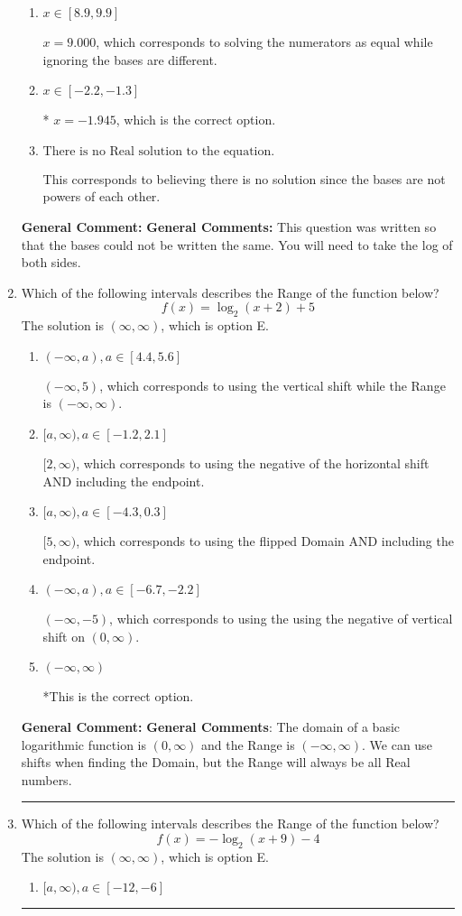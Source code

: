 \documentclass{extbook}[14pt]
\newcommand{\litem}[1]{\item #1

\rule{\textwidth}{0.4pt}}
\begin{document}
\begin{enumerate}
{\begin{enumerate}[label=\Alph*.]
$x = -0.768$, which corresponds to distributing the $\ln(base)$ to the first term of the exponent only.
\item \( x \in [8.9, 9.9] \)

$x = 9.000$, which corresponds to solving the numerators as equal while ignoring the bases are different.
\item \( x \in [-2.2, -1.3] \)

* $x = -1.945$, which is the correct option.
\item \( \text{There is no Real solution to the equation.} \)

This corresponds to believing there is no solution since the bases are not powers of each other.
\end{enumerate}

\textbf{General Comment:} \textbf{General Comments:} This question was written so that the bases could not be written the same. You will need to take the log of both sides.
}
\litem{
Which of the following intervals describes the Range of the function below?
\[ f(x) = \log_2{(x+2)}+5 \]The solution is \( (\infty, \infty) \), which is option E.\begin{enumerate}[label=\Alph*.]
\item \( (-\infty, a), a \in [4.4, 5.6] \)

$(-\infty, 5)$, which corresponds to using the vertical shift while the Range is $(-\infty, \infty)$.
\item \( [a, \infty), a \in [-1.2, 2.1] \)

$[2, \infty)$, which corresponds to using the negative of the horizontal shift AND including the endpoint.
\item \( [a, \infty), a \in [-4.3, 0.3] \)

$[5, \infty)$, which corresponds to using the flipped Domain AND including the endpoint.
\item \( (-\infty, a), a \in [-6.7, -2.2] \)

$(-\infty, -5)$, which corresponds to using the using the negative of vertical shift on $(0, \infty)$.
\item \( (-\infty, \infty) \)

*This is the correct option.
\end{enumerate}

\textbf{General Comment:} \textbf{General Comments}: The domain of a basic logarithmic function is $(0, \infty)$ and the Range is $(-\infty, \infty)$. We can use shifts when finding the Domain, but the Range will always be all Real numbers.
}
\litem{
Which of the following intervals describes the Range of the function below?
\[ f(x) = -\log_2{(x+9)}-4 \]The solution is \( (\infty, \infty) \), which is option E.\begin{enumerate}[label=\Alph*.]
\item \( [a, \infty), a \in [-12, -6] \)


\end{enumerate}}
\end{enumerate}
\end{document}
